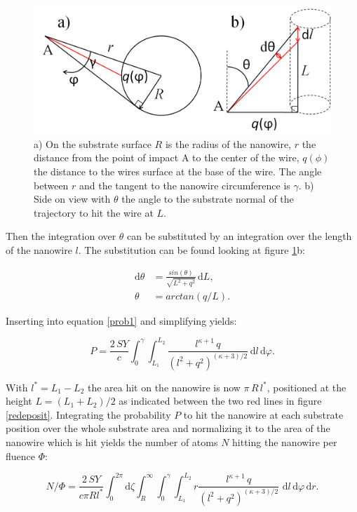 \begin{figure}
	\centering
		\includegraphics[width=.6\textwidth]{images/anglesredeposition.jpg}
	\caption{a) On the substrate surface $R$ is the radius of the nanowire, $r$ the distance from the point of impact A to the center of the wire, $q(\phi)$ the distance to the wires surface at the base of the wire. The angle between $r$ and the tangent to the nanowire circumference is $\gamma$. b) Side on view with $\theta$ the angle to the substrate normal of the trajectory to hit the wire at $L$.} 
	\label{anglesredepo}
\end{figure} 

Then the integration over $\theta$ can be substituted by an integration over the length of the nanowire $l$. The substitution can be found looking at figure \ref{anglesredepo}b:

\begin{align*}
\mathrm{d}\theta &= \frac{sin(\theta)}{\sqrt{L^2 + q^2}}\,\mathrm{d}L,\\
\theta &= arctan(q/L).
\end{align*}

Inserting into equation \ref{prob1} and simplifying yields:

\begin{equation}
\label{prob2}
P = \frac{2\,SY}{c} \int_0^{\gamma} \! \int_{L_1}^{L_2} \!  \frac{l^{\kappa+1}\,q}{(l^2 + q^2)^{(\kappa + 3)/2}} \,\mathrm{d}l \, \mathrm{d}\varphi.
\end{equation}

With $l^*=L_1-L_2$ the area hit on the nanowire is now $\pi \, R \, l^*$, positioned at the height $L= (L_1+L_2)/2$ as indicated between the two red lines in figure \ref{redeposit}. Integrating the probability $P$ to hit the nanowire at each substrate position over the whole substrate area and normalizing it to the area of the nanowire which is hit yields the number of atoms $N$ hitting the nanowire per fluence $\Phi$:

\begin{equation}
\label{prob3}
N/\Phi = \frac{2\,SY}{c \pi Rl^*} \int_0^{2\pi}\! \mathrm{d}\zeta \int_R^{\infty} \!
\int_0^{\gamma} \! \int_{L_1}^{L_2} \! r \frac{l^{\kappa+1}\,q}{(l^2 + q^2)^{(\kappa + 3)/2}}\,\,\mathrm{d}l \, \mathrm{d}\varphi\,\mathrm{d}r.
\end{equation}

